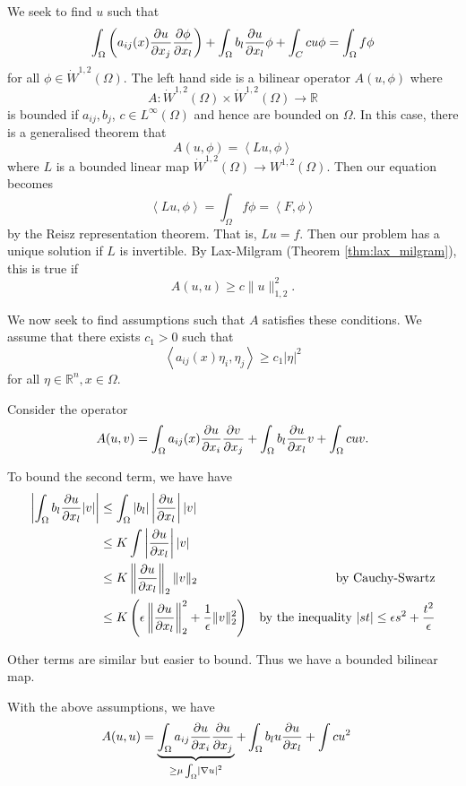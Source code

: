 \documentclass[10pt, oneside, reqno]{amsart}
\theoremstyle{plain}%
\numberwithin{equation}{section}
\theoremstyle{definition}
\theoremstyle{remark}
\newcommand{\R}{\mathbb{R}}
\newcommand{\iprod}[1]{\left\langle #1 \right\rangle}
\begin{document}
We seek to find $u$ such that \[
    \int_\Omega \left( a_{ij}(x) \frac{\partial u}{\partial x_j} \frac{\partial \phi}{\partial x_l}\right) + \int_\Omega b_l \frac{\partial u}{\partial x_l} \phi + \int_C c u \phi = \int_\Omega f \phi 
 \] for all $\phi \in \dot W^{1, 2}(\Omega)$.  The left hand side is a bilinear operator $A(u, \phi)$ where
 \[
    A: \dot W^{1, 2}(\Omega) \times \dot W^{1, 2}(\Omega) \rightarrow \R
 \] is bounded if $a_{ij}, b_j$, $c \in L^\infty(\Omega)$ and hence are bounded on $\Omega$.  In this case, there is a generalised theorem that \[
    A(u, \phi) = \iprod{Lu, \phi} 
 \] where $L$ is a bounded linear map $\dot W^{1, 2}(\Omega) \rightarrow W^{1, 2}(\Omega)$.  Then our equation becomes \[
    \iprod{Lu, \phi} = \int_\Omega f \phi = \iprod{F, \phi}
 \] by the Reisz representation theorem.  That is, $Lu = f$.  Then our problem has a unique solution if $L$ is invertible.  By Lax-Milgram (Theorem \ref{thm:lax_milgram}), this is true if \[
    A(u, u) \geq c \| u \|^2_{1, 2}.
\]

We now seek to find assumptions such that $A$ satisfies these conditions.  We assume that there exists $c_1 > 0$ such that \[
    \iprod{a_{ij}(x)\eta_i, \eta_j} \geq c_1 |\eta|^2 \tag{$\dagger \dagger$}
\] for all $\eta \in \R^n, x \in \Omega$. 

Consider the operator \[
    A(u, v) = \int_\Omega a_{ij}(x) \frac{\partial u}{\partial x_i} \frac{\partial v}{\partial x_j} + \int_\Omega b_l \frac{\partial u}{\partial x_l} v + \int_\Omega cuv.
 \]


To bound the second term, we have have \begin{align*}
    \left| \int_\Omega b_l \frac{\partial u}{\partial x_l} |v| \right| &\leq \int_\Omega |b_l| \left| \frac{\partial u}{\partial x_l} \right| |v| \\
    &\leq K \int \left| \frac{\partial u}{\partial x_l} \right| |v| \\
    &\leq K \left\| \frac{\partial u}{\partial x_l} \right\|_2 \| v \|_2  &\text{by Cauchy-Swartz} \\
    &\leq K \left( \epsilon \left\| \frac{\partial u}{\partial x_l} \right \|_2^2 +  \frac{1}{\epsilon} \|v\|_2^2 \right) &\text{by the inequality $|st| \leq \epsilon s^2 + \frac{t^2}{\epsilon}$}
\end{align*}

Other terms are similar but easier to bound.  Thus we have a bounded bilinear map.

With the above assumptions, we have \begin{align*}
    A(u, u) &= \underbrace{\int_\Omega a_{ij}\frac{\partial u}{\partial x_i}\frac{\partial u}{\partial x_j}}_{\geq \mu \int_\Omega \left| \nabla u \right|^2} + \int_\Omega b_l u \frac{\partial u}{\partial x_l} + \int c u^2           
\end{align*}
\end{document}
